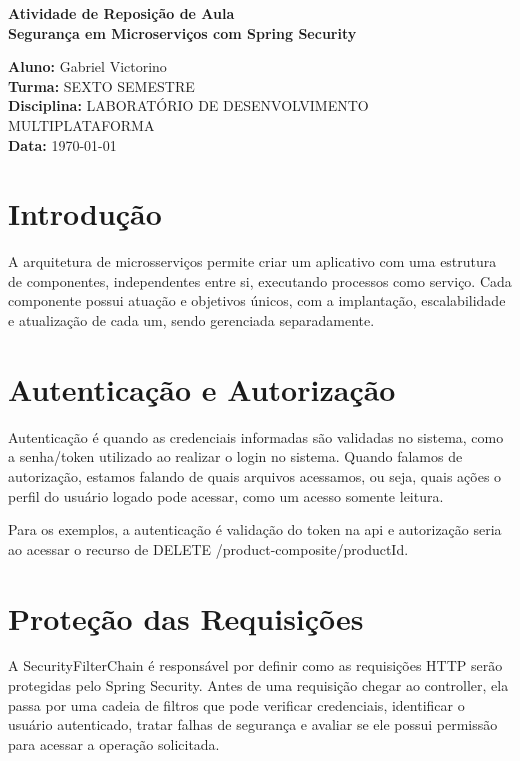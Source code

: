 \documentclass[12pt,a4paper]{article}
\begin{document}
\begin{center}
	{\large \textbf{Atividade de Reposição de Aula}}\\
	\vspace{0.5cm}
	\textbf{Segurança em Microserviços com Spring Security}\\
\end{center}

\vspace{0.7cm}

\noindent
\textbf{Aluno:} Gabriel Victorino\\
\textbf{Turma:} SEXTO SEMESTRE\\
\textbf{Disciplina:} LABORATÓRIO DE DESENVOLVIMENTO MULTIPLATAFORMA\\
\textbf{Data:} \today

\vspace{0.5cm}	

\section{Introdução}
	A arquitetura de microsserviços permite criar um aplicativo com uma estrutura de componentes, independentes entre si, executando processos como serviço. Cada componente possui atuação e objetivos únicos, com a implantação, escalabilidade e atualização de cada um, sendo gerenciada separadamente.


\section{Autenticação e Autorização}
Autenticação é quando as credenciais informadas são validadas no sistema, como a senha/token utilizado ao realizar o login no sistema. Quando falamos de autorização, estamos falando de quais arquivos acessamos, ou seja, quais ações o perfil do usuário logado pode acessar, como um acesso somente leitura.

Para os exemplos, a autenticação é validação do token na api e autorização seria ao acessar o recurso de DELETE /product-composite/{productId}.

\section{Proteção das Requisições}
A SecurityFilterChain é responsável por definir como as requisições HTTP serão protegidas pelo Spring Security. Antes de uma requisição chegar ao controller, ela passa por uma cadeia de filtros que pode verificar credenciais, identificar o usuário autenticado, tratar falhas de segurança e avaliar se ele possui permissão para acessar a operação solicitada.
\end{document}
